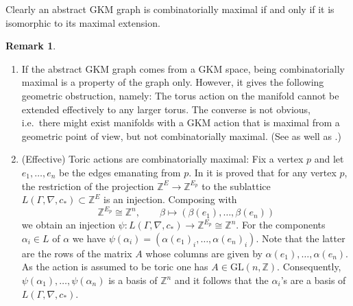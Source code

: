 \documentclass[12pt,a4paper]{amsart}
\newcommand{\GL}{\mathrm{GL}}
\newcommand{\ZZ}{\mathbb{Z}}
\theoremstyle{plain}
\theoremstyle{definition}
\newtheorem{rem}[thm]{Remark}
\begin{document}
Clearly an abstract GKM graph is combinatorially maximal if and only if it is isomorphic to its maximal extension.

\begin{rem}\label{rem: combmax}
\begin{enumerate}\item
If the abstract GKM graph comes from a GKM space, being combinatorially maximal is a property of the graph only.
However, it gives the following geometric obstruction, namely: 
The torus action on the manifold cannot be extended effectively to any larger torus. 
The converse is not obvious, i.e.\ there might exist manifolds with a GKM action that is
maximal from a geometric point of view, but not combinatorially maximal. (See
\cite[Corollary 1.3]{MR3943448} as well as \cite[Section 4]{MR3943448}.) 
\item (Effective) Toric actions are combinatorially maximal: Fix a vertex $p$ and let $e_1,\ldots,e_n$ be the edges emanating from $p$.  
In \cite[Lemma 3.2]{MR3943448} it is proved that for any vertex $p$, the restriction of the projection $\ZZ^{E}\rightarrow \ZZ^{E_p}$ to the sublattice $L(\Gamma,\nabla,c_*)\subset \ZZ^{E}$ is an injection.
Composing with \[\ZZ^{E_p}\cong \ZZ^n,\qquad\beta\mapsto (\beta(e_1),\ldots,\beta(e_n))\] 
we obtain an injection $\psi\colon L(\Gamma,\nabla,c_*)\rightarrow \ZZ^{E_p}\cong \ZZ^n$. For the components $\alpha_i\in L$ of $\alpha$ we have $\psi(\alpha_i)=(\alpha(e_1)_i,\ldots,\alpha(e_n)_i)$. Note that the latter are the rows of the matrix $A$ whose columns are given by $\alpha(e_1),\ldots,\alpha(e_n)$. As the action is assumed to be toric one has $A\in \GL(n,\ZZ)$.
Consequently, $\psi(\alpha_1),\ldots,\psi(\alpha_n)$ is a basis of $\ZZ^n$ and it follows that the $\alpha_i$'s are a basis of $L(\Gamma,\nabla,c_*)$.



\end{enumerate}
\end{rem}
\end{document}
